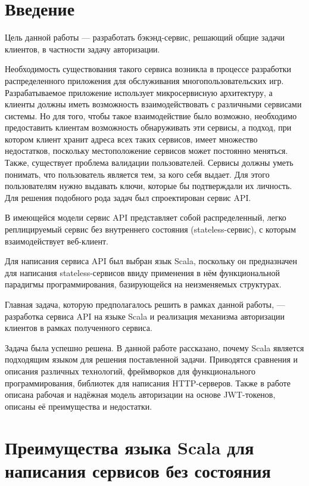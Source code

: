 \documentclass[14pt]{extarticle}
\begin{document}
    \tableofcontents
    \newpage

    \section{Введение}

    Цель данной работы --- разработать бэкэнд-сервис, решающий общие задачи клиентов, в частности задачу авторизации.

    Необходимость существования такого сервиса возникла в процессе разработки распределенного приложения для
    обслуживания многопользовательских игр.
    Разрабатываемое приложение использует микросервисную архитектуру, а клиенты должны иметь возможность
    взаимодействовать с различными сервисами системы.
    Но для того, чтобы такое взаимодействие было возможно, необходимо предоставить клиентам возможность обнаруживать
    эти сервисы, а подход, при котором клиент хранит адреса всех таких сервисов, имеет множество недостатков,
    поскольку местоположение сервисов может постоянно меняться. Также,
    существует проблема валидации пользователей.
    Сервисы должны уметь
    понимать, что пользователь является тем, за кого себя выдает. Для этого пользователям нужно выдавать ключи,
    которые бы подтверждали их личность.
    Для решения подобного рода задач был спроектирован сервис API.

    В имеющейся модели сервис API представляет собой распределенный, легко реплицируемый сервис без внутреннего
    состояния (stateless-сервис), с которым взаимодействует веб-клиент.

    Для написания сервиса API был выбран язык Scala\cite{scala}, поскольку он предназначен для написания
    stateless-сервисов ввиду применения в нём функциональной парадигмы программирования, базирующейся на неизменяемых структурах.

    Главная задача, которую предполагалось решить в рамках данной работы, --- разработка сервиса API на языке Scala и реализация механизма авторизации клиентов в рамках полученного сервиса.

    Задача была успешно решена. В данной работе рассказано, почему Scala является подходящим языком для решения поставленной задачи. 
    Приводятся сравнения и описания различных технологий, фреймворков для функционального программирования, библиотек для написания HTTP-серверов. 
    Также в работе описана рабочая и надёжная модель авторизации на основе JWT-токенов, описаны её преимущества и недостатки.


    \section{Преимущества языка Scala для написания сервисов без состояния}
\end{document}
